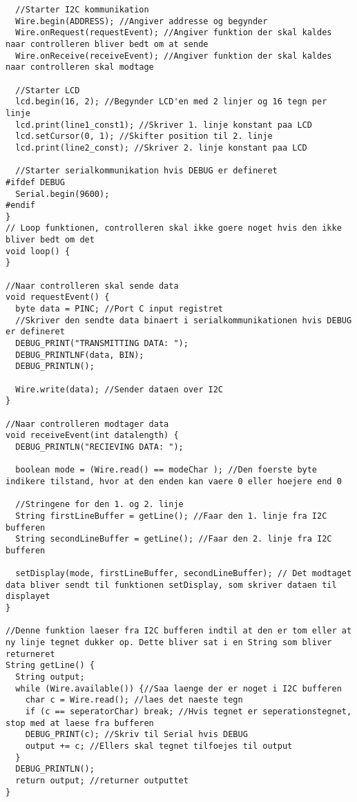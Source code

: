 \begin{lstlisting}
  //Starter I2C kommunikation
  Wire.begin(ADDRESS); //Angiver addresse og begynder
  Wire.onRequest(requestEvent); //Angiver funktion der skal kaldes naar controlleren bliver bedt om at sende
  Wire.onReceive(receiveEvent); //Angiver funktion der skal kaldes naar controlleren skal modtage

  //Starter LCD
  lcd.begin(16, 2); //Begynder LCD'en med 2 linjer og 16 tegn per linje
  lcd.print(line1_const1); //Skriver 1. linje konstant paa LCD
  lcd.setCursor(0, 1); //Skifter position til 2. linje
  lcd.print(line2_const); //Skriver 2. linje konstant paa LCD

  //Starter serialkommunikation hvis DEBUG er defineret
#ifdef DEBUG
  Serial.begin(9600);
#endif
}
// Loop funktionen, controlleren skal ikke goere noget hvis den ikke bliver bedt om det
void loop() {
}

//Naar controlleren skal sende data
void requestEvent() {
  byte data = PINC; //Port C input registret
  //Skriver den sendte data binaert i serialkommunikationen hvis DEBUG er defineret
  DEBUG_PRINT("TRANSMITTING DATA: ");
  DEBUG_PRINTLNF(data, BIN);
  DEBUG_PRINTLN();

  Wire.write(data); //Sender dataen over I2C
}

//Naar controlleren modtager data
void receiveEvent(int datalength) {
  DEBUG_PRINTLN("RECIEVING DATA: ");

  boolean mode = (Wire.read() == modeChar ); //Den foerste byte indikere tilstand, hvor at den enden kan vaere 0 eller hoejere end 0

  //Stringene for den 1. og 2. linje
  String firstLineBuffer = getLine(); //Faar den 1. linje fra I2C bufferen
  String secondLineBuffer = getLine(); //Faar den 2. linje fra I2C bufferen

  setDisplay(mode, firstLineBuffer, secondLineBuffer); // Det modtaget data bliver sendt til funktionen setDisplay, som skriver dataen til displayet
}

//Denne funktion laeser fra I2C bufferen indtil at den er tom eller at ny linje tegnet dukker op. Dette bliver sat i en String som bliver returneret
String getLine() {
  String output;
  while (Wire.available()) {//Saa laenge der er noget i I2C bufferen
    char c = Wire.read(); //laes det naeste tegn
    if (c == seperatorChar) break; //Hvis tegnet er seperationstegnet, stop med at laese fra bufferen
    DEBUG_PRINT(c); //Skriv til Serial hvis DEBUG
    output += c; //Ellers skal tegnet tilfoejes til output
  }
  DEBUG_PRINTLN();
  return output; //returner outputtet
}


\end{lstlisting}
